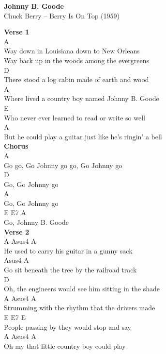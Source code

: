 \documentclass[a4paper]{article}
\begin{document}
    \begin{center}
        \textbf{Johnny B. Goode}
        ~\\
        Chuck Berry -- Berry Is On Top (1959)
    \end{center}
    {
        \scriptsize
        \textbf{Verse 1}
        ~\\
        {
            \cutive
            \obeyspaces
    A
\\
Way down in Louisiana down to New Orleans
\\
Way back up in the woods among the evergreens
\\
      D
\\
There stood a log cabin made of earth and wood
\\
      A
\\
Where lived a country boy named Johnny B. Goode
\\
    E
\\
Who never ever learned to read or write so well
\\
             A
\\
But he could play a guitar just like he's ringin' a bell
\\

        }
        \textbf{Chorus}
        ~\\
        {
            \cutive
            \obeyspaces
A
\\
Go go, Go Johnny go go, Go Johnny go
\\
D
\\
Go, Go Johnny go
\\
A
\\
Go, Go Johnny go
\\
E  E7          A
\\
Go, Johnny B. Goode
\\

        }
        \textbf{Verse 2}
        ~\\
        {
            \cutive
            \obeyspaces
   A                             Asus4 A
\\
He used to carry his guitar in a gunny sack
\\
                               Asus4    A
\\
Go sit beneath the tree by the railroad track
\\
        D
\\
Oh, the engineers would see him sitting in the shade
\\
A                                  Asus4   A
\\
Strumming with the rhythm that the drivers made
\\
E                            E7       E
\\
People passing by they would stop and say
\\
   A                      Asus4     A
\\
Oh my that little country boy could play
\\

}}
\end{document}
